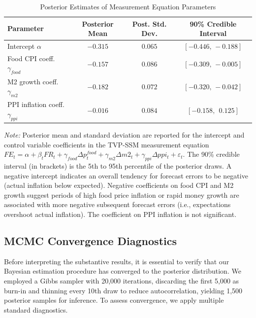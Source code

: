 \documentclass[12pt]{article}
\begin{document}
\begin{table}[!htbp]
    \centering
    \caption{Posterior Estimates of Measurement Equation Parameters}
    \label{tab:ols_baseline}
    \begin{threeparttable}
        \begin{tabular}{lccc}
            \toprule
            Parameter                           & Posterior Mean & Post. Std. Dev. & 90\% Credible Interval \\
            \midrule
            Intercept $\alpha$                  & $-0.315$       & $0.065$         & $[-0.446,\,-0.188]$    \\
            Food CPI coeff. $\gamma_{food}$     & $-0.157$       & $0.086$         & $[-0.309,\,-0.005]$    \\
            M2 growth coeff. $\gamma_{m2}$      & $-0.182$       & $0.072$         & $[-0.320,\,-0.042]$    \\
            PPI inflation coeff. $\gamma_{ppi}$ & $-0.016$       & $0.084$         & $[-0.158,~~0.125]$     \\
            \bottomrule
        \end{tabular}
        \begin{tablenotes}
            \footnotesize
            \item \textit{Note:} Posterior mean and standard deviation are reported for the intercept and control variable coefficients in the TVP-SSM measurement equation $FE_t = \alpha + \beta_t FR_t + \gamma_{food} \Delta p^{food}_t + \gamma_{m2} \Delta m2_t + \gamma_{ppi} \Delta ppi_t + \varepsilon_t$. The 90\% credible interval (in brackets) is the 5th to 95th percentile of the posterior draws. A negative intercept indicates an overall tendency for forecast errors to be negative (actual inflation below expected). Negative coefficients on food CPI and M2 growth suggest periods of high food price inflation or rapid money growth are associated with more negative subsequent forecast errors (i.e., expectations overshoot actual inflation). The coefficient on PPI inflation is not significant.
        \end{tablenotes}
    \end{threeparttable}
\end{table}

\subsection{MCMC Convergence Diagnostics}
Before interpreting the substantive results, it is essential to verify that our Bayesian estimation procedure has converged to the posterior distribution. We employed a Gibbs sampler with 20,000 iterations, discarding the first 5,000 as burn-in and thinning every 10th draw to reduce autocorrelation, yielding 1,500 posterior samples for inference. To assess convergence, we apply multiple standard diagnostics.
\end{document}
